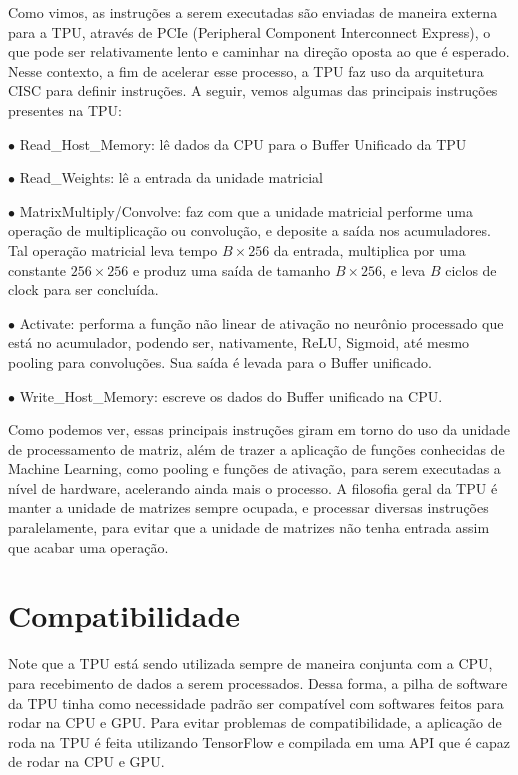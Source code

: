\documentclass{report}
\begin{document}
Como vimos, as instruções a serem executadas são enviadas de maneira externa para a TPU, através de PCIe (Peripheral Component Interconnect Express), o que pode ser relativamente lento e caminhar na direção oposta ao que é esperado. Nesse contexto, a fim de acelerar esse processo, a TPU faz uso da arquitetura CISC para definir instruções. A seguir, vemos algumas das principais instruções presentes na TPU:

$\bullet$ Read\_Host\_Memory: lê dados da CPU para o Buffer Unificado da TPU

$\bullet$ Read\_Weights: lê a entrada da unidade matricial

$\bullet$ MatrixMultiply/Convolve: faz com que a unidade matricial performe uma operação de multiplicação ou convolução, e deposite a saída nos acumuladores. Tal operação matricial leva tempo $B \times 256$ da entrada, multiplica por uma constante $256 \times 256$ e produz uma saída de tamanho $B \times 256$, e leva $B$ ciclos de clock para ser concluída.

$\bullet$ Activate: performa a função não linear de ativação no neurônio processado que está no acumulador, podendo ser, nativamente, ReLU, Sigmoid, até mesmo pooling para convoluções. Sua saída é levada para o Buffer unificado.

$\bullet$ Write\_Host\_Memory: escreve os dados do Buffer unificado na CPU.

Como podemos ver, essas principais instruções giram em torno do uso da unidade de processamento de matriz, além de trazer a aplicação de funções conhecidas de Machine Learning, como pooling e funções de ativação, para serem executadas a nível de hardware, acelerando ainda mais o processo. A filosofia geral da TPU é manter a unidade de matrizes sempre ocupada, e processar diversas instruções paralelamente, para evitar que a unidade de matrizes não tenha entrada assim que acabar uma operação.

\section{Compatibilidade}

Note que a TPU está sendo utilizada sempre de maneira conjunta com a CPU, para recebimento de dados a serem processados. Dessa forma, a pilha de software da TPU tinha como necessidade padrão ser compatível com softwares feitos para rodar na CPU e GPU. Para evitar problemas de compatibilidade, a aplicação de roda na TPU é feita utilizando TensorFlow e compilada em uma API que é capaz de rodar na CPU e GPU.
\end{document}

